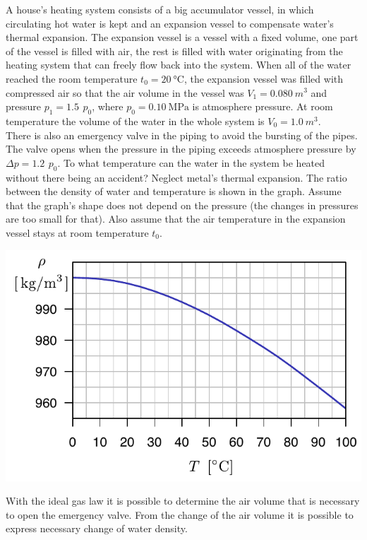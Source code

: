 {\ifEngStatement
A house’s heating system consists of a big accumulator vessel, in which circulating hot water is kept and an expansion vessel to compensate water’s thermal expansion. The expansion vessel is a vessel with a fixed volume, one part of the vessel is filled with air, the rest is filled with water originating from the heating system that can freely flow back into the system. When all of the water reached the room temperature $t_0=\SI{20}{\celsius}$, the expansion vessel was filled with compressed air so that the air volume in the vessel was $V_1=\SI{0.080}{m^3}$ and pressure $p_1=\SI{1.5}{}\,p_0$, where $p_0=\SI{0.10}{\mega\pascal}$ is atmosphere pressure. At room temperature the volume of the water in the whole system is $V_0=\SI{1.0}{m^3}$.\\
There is also an emergency valve in the piping to avoid the bursting of the pipes. The valve opens when the pressure in the piping exceeds atmosphere pressure by $\Delta p = \SI{1.2}{} \, p_0 $. To what temperature can the water in the system be heated without there being an accident? Neglect metal’s thermal expansion. The ratio between the density of water and temperature is shown in the graph. Assume that the graph’s shape does not depend on the pressure (the changes in pressures are too small for that). Also assume that the air temperature in the expansion vessel stays at room temperature $t_0$.
\begin{center}
\includegraphics[width=0.8\linewidth]{2014-v3g-03-veeTihedus}
\end{center}
\fi


\ifEngHint
With the ideal gas law it is possible to determine the air volume that is necessary to open the emergency valve. From the change of the air volume it is possible to express necessary change of water density.
\fi


}
